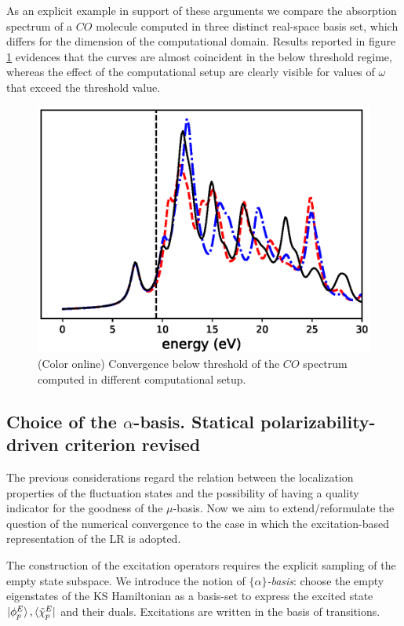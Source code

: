 \documentclass[reprint,aps,prb]{revtex4-1}
\begin{document}
As an explicit example in support of these arguments we compare the absorption spectrum of a $CO$ molecule computed in three distinct real-space basis set, which differs for the dimension of 
the computational domain. Results reported in figure \ref{co_spectrum} evidences that the curves are almost coincident in the below threshold regime, whereas the effect of the computational 
setup are clearly visible for values of $\omega$ that exceed the threshold value. 

\begin{figure}
\includegraphics[scale=0.56]{co_spectrum.eps}
\caption{\label{co_spectrum}(Color online) Convergence below threshold of the $CO$ spectrum computed in different computational setup.}
\end{figure}



\subsection{Choice of the $\alpha$-basis. Statical polarizability-driven criterion revised}

The previous considerations regard the relation between the localization properties of the fluctuation states and the possibility of having a quality indicator for the goodness of the $\mu$-basis. 
Now we aim to extend/reformulate the question of the numerical convergence to the case in which the excitation-based representation of the LR is adopted.

The construction of the excitation operators requires the explicit sampling of the empty state subspace. We introduce the notion of \emph{$\{\alpha\}$-basis}: choose the empty eigenstates of the KS 
Hamiltonian as a basis-set to express the excited state $\ket{\phi^E_p},\bra{\tilde\chi^E_p}$ and their duals. Excitations are written in the basis of transitions.  
\end{document}
